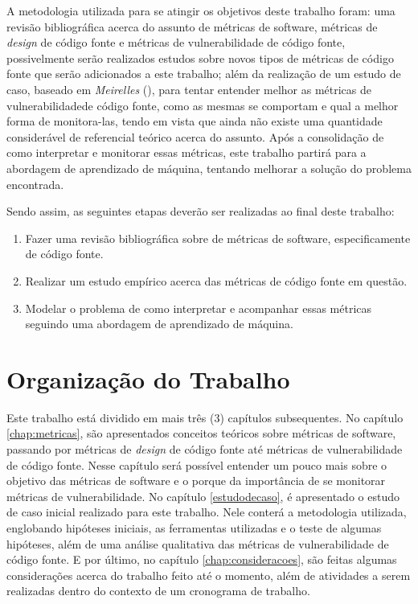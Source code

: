 A metodologia utilizada para se atingir os objetivos deste trabalho foram: uma
revisão bibliográfica acerca do assunto de métricas de software, métricas de
\textit{design} de código fonte e métricas de vulnerabilidade de código fonte,
possivelmente serão realizados estudos sobre novos tipos de métricas de código
fonte que serão adicionados a este trabalho; além da realização de um estudo de 
caso, baseado em \emph{Meirelles} (\citeyear{meirelles2013}), para tentar entender 
melhor as métricas de vulnerabilidadede código fonte, como as mesmas se comportam 
e qual a melhor forma de monitora-las, tendo em vista que ainda não existe uma
quantidade considerável de referencial teórico acerca do assunto. Após a
consolidação de como interpretar e monitorar essas métricas, este trabalho
partirá para a abordagem de aprendizado de máquina, tentando melhorar a solução
do problema encontrada.

Sendo assim, as seguintes etapas deverão ser realizadas ao final deste trabalho:

\begin{enumerate}
  \item Fazer uma revisão bibliográfica sobre de métricas de software,
    especificamente de código fonte.
  \item Realizar um estudo empírico acerca das métricas de código fonte em
    questão.
  \item Modelar o problema de como interpretar e acompanhar essas métricas
    seguindo uma abordagem de aprendizado de máquina.
\end{enumerate}


\section{Organização do Trabalho}

Este trabalho está dividido em mais três (3) capítulos subsequentes. No capítulo
\ref{chap:metricas}, são apresentados conceitos teóricos sobre métricas de
software, passando por métricas de \textit{design} de código fonte até métricas de 
vulnerabilidade de código fonte. Nesse capítulo será possível entender um pouco mais 
sobre o objetivo das métricas de software e o porque da importância de se monitorar
métricas de vulnerabilidade. No capítulo \ref{estudodecaso}, é apresentado o
estudo de caso inicial realizado para este trabalho. Nele conterá a metodologia
utilizada, englobando hipóteses iniciais, as ferramentas utilizadas e o teste de
algumas hipóteses, além de uma análise qualitativa das métricas de
vulnerabilidade de código fonte. E por último, no capítulo
\ref{chap:consideracoes}, são feitas algumas considerações acerca do trabalho
feito até o momento, além de atividades a serem realizadas dentro do contexto de
um cronograma de trabalho.

